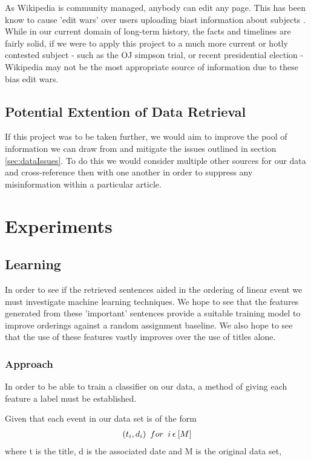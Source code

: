 \documentclass[bsc,frontabs,twoside,singlespacing,parskip,deptreport]{infthesis}     %
\begin{document}
As Wikipedia is community managed, anybody can edit any page. This has been know to cause 'edit wars' over users
uploading biast information about subjects \cite{}.
While in our current domain of long-term history, the facts and timelines are fairly solid, if we were to apply this project
to a much more current or hotly contested subject - such as the OJ simpson trial, or recent presidential election - Wikipedia
may not be the most appropriate source of information due to these bias edit wars.


\section{Potential Extention of Data Retrieval}
If this project was to be taken further, we would aim to improve the pool of information we can draw from and mitigate the issues outlined in section \ref{sec:dataIssues}.
To do this we would consider multiple other sources for our data and cross-reference then with one another in order to suppress any misinformation within
a particular article.

\chapter{Experiments}
\section{Learning}
In order to see if the retrieved sentences aided in the  ordering of linear event we must investigate machine learning
techniques. We hope to see that the features generated from these 'important' sentences provide a suitable training model
to improve orderings against a random assignment baseline. We also hope to see that the use of these features vastly
improves over the use of titles alone.



\subsection{Approach}
In order to be able to train a classifier on our data, a method of giving each feature a label must be established.

 Given that each event in our data set is of the form
  \begin{eqnarray}
  (t_{i},d_{i}) \hspace{0.5em}for\hspace{0.5em} i \hspace{0.2em}\epsilon \hspace{0.2em} [M]\nonumber
    \end{eqnarray}
    where t is the title, d is the associated date and M is the original data set,
\end{document}
